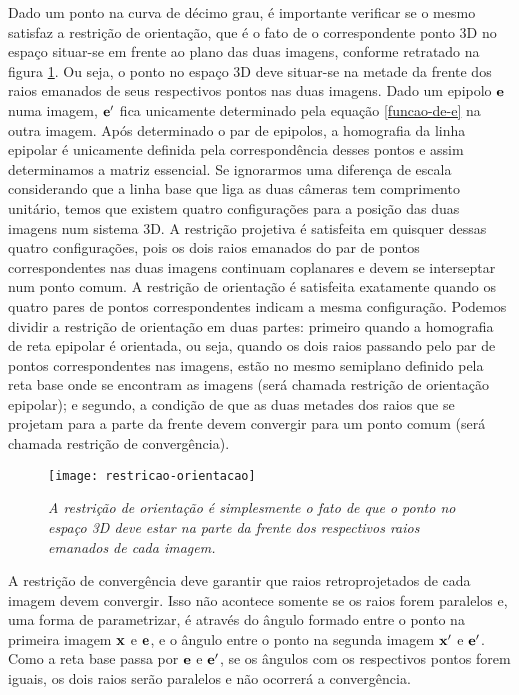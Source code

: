 Dado um ponto na curva de décimo grau, é importante verificar se o mesmo satisfaz a restrição de orientação, que é o fato de o correspondente ponto 3D no espaço situar-se em frente ao plano das duas imagens, conforme retratado na figura \ref{retr-orien}. Ou seja, o ponto no espaço 3D deve situar-se na metade da frente dos raios emanados de seus respectivos pontos nas duas imagens. Dado um epipolo ${\bf e}$ numa imagem, ${\bf e'}$ fica unicamente determinado pela equação \ref{funcao-de-e} na outra imagem. Após determinado o par de epipolos, a homografia da linha epipolar é unicamente definida pela correspondência desses pontos e assim determinamos a matriz essencial. Se ignorarmos uma diferença de escala considerando que a linha base que liga as duas câmeras tem comprimento unitário, temos que existem quatro configurações para a posição das duas imagens num sistema 3D. A restrição projetiva é satisfeita em quisquer dessas quatro configurações, pois os dois raios emanados do par de pontos correspondentes nas duas imagens continuam coplanares e devem se interseptar num ponto comum. A restrição de orientação é satisfeita exatamente quando os quatro pares de pontos correspondentes indicam a mesma configuração. Podemos dividir a restrição de orientação em duas partes: primeiro quando a homografia de reta epipolar é orientada, ou seja, quando os dois raios passando pelo par de pontos correspondentes nas imagens, estão no mesmo semiplano definido pela reta base onde se encontram as imagens (será chamada restrição de orientação epipolar); e segundo, a condição de que as duas metades dos raios que se projetam para a parte da frente devem convergir para um ponto comum (será chamada restrição de convergência).  

\begin{figure}[!htb]
\centering
\texttt{[image: restricao-orientacao]}
\caption{\textit{A restrição de orientação é simplesmente o fato de que o ponto no espaço 3D deve estar na parte da frente dos respectivos raios emanados de cada imagem.}}
\label{retr-orien}
\end{figure}

A restrição de convergência deve garantir que raios retroprojetados de cada imagem devem convergir. Isso não acontece somente se os raios forem paralelos e, uma forma de parametrizar, é através do ângulo formado entre o ponto na primeira imagem ${\bf x}$ e ${\bf e}$, e o ângulo entre o ponto na segunda imagem ${\bf x'}$ e ${\bf e'}$. Como a reta base passa por ${\bf e}$ e ${\bf e'}$, se os ângulos com os respectivos pontos forem iguais, os dois raios serão paralelos e não ocorrerá a convergência.



